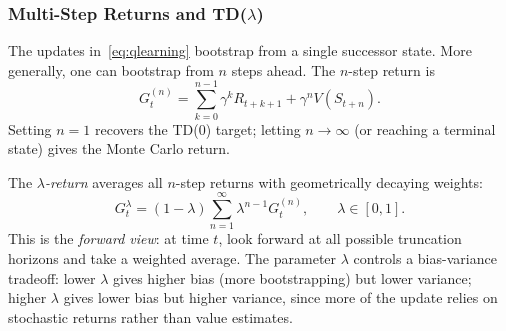 \subsubsection{Multi-Step Returns and TD($\lambda$)}
\label{sec:td_lambda}

The updates in~\eqref{eq:qlearning} bootstrap from a single successor state. More generally, one can bootstrap from $n$ steps ahead. The $n$-step return is
\begin{equation}
G_t^{(n)} = \sum_{k=0}^{n-1} \gamma^k R_{t+k+1} + \gamma^n V(S_{t+n}).
\label{eq:n_step_return}
\end{equation}
Setting $n=1$ recovers the TD(0) target; letting $n \to \infty$ (or reaching a terminal state) gives the Monte Carlo return.

The \emph{$\lambda$-return} \citep{sutton1988} averages all $n$-step returns with geometrically decaying weights:
\begin{equation}
G_t^\lambda = (1-\lambda) \sum_{n=1}^{\infty} \lambda^{n-1} G_t^{(n)}, \qquad \lambda \in [0,1].
\label{eq:lambda_return}
\end{equation}
This is the \emph{forward view}: at time $t$, look forward at all possible truncation horizons and take a weighted average. The parameter $\lambda$ controls a bias-variance tradeoff: lower $\lambda$ gives higher bias (more bootstrapping) but lower variance; higher $\lambda$ gives lower bias but higher variance, since more of the update relies on stochastic returns rather than value estimates.

